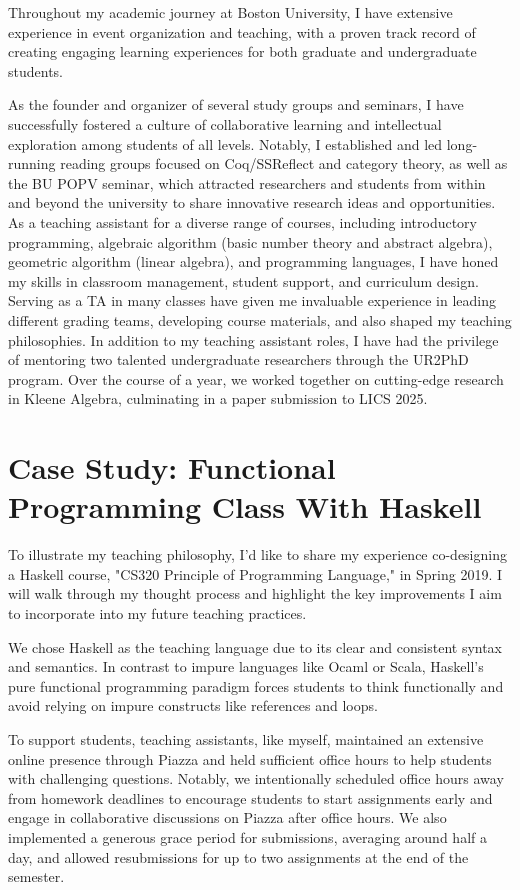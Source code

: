 \documentclass[11pt,a4paper,sans]{moderncv} %
\begin{document}
Throughout my academic journey at Boston University, I have extensive experience in event organization and teaching, with a proven track record of creating engaging learning experiences for both graduate and undergraduate students.

As the founder and organizer of several study groups and seminars, I have successfully fostered a culture of collaborative learning and intellectual exploration among students of all levels. 
Notably, I established and led long-running reading groups focused on Coq/SSReflect and category theory, as well as the BU POPV seminar, which attracted researchers and students from within and beyond the university to share innovative research ideas and opportunities.
As a teaching assistant for a diverse range of courses, including introductory programming, algebraic algorithm (basic number theory and abstract algebra), geometric algorithm (linear algebra), and programming languages, I have honed my skills in classroom management, student support, and curriculum design. 
Serving as a TA in many classes have given me invaluable experience in leading different grading teams, developing course materials, and also shaped my teaching philosophies.
In addition to my teaching assistant roles, I have had the privilege of mentoring two talented undergraduate researchers through the UR2PhD program. 
Over the course of a year, we worked together on cutting-edge research in Kleene Algebra, culminating in a paper submission to LICS 2025.

\section{Case Study: Functional Programming Class With Haskell}

To illustrate my teaching philosophy, I'd like to share my experience co-designing a Haskell course, "CS320 Principle of Programming Language," in Spring 2019.
I will walk through my thought process and highlight the key improvements I aim to incorporate into my future teaching practices.

We chose Haskell as the teaching language due to its clear and consistent syntax and semantics. 
In contrast to impure languages like Ocaml or Scala, Haskell's pure functional programming paradigm forces students to think functionally and avoid relying on impure constructs like references and loops.

To support students, teaching assistants, like myself, maintained an extensive online presence through Piazza and held sufficient office hours to help students with challenging questions. 
Notably, we intentionally scheduled office hours away from homework deadlines to encourage students to start assignments early and engage in collaborative discussions on Piazza after office hours.
We also implemented a generous grace period for submissions, averaging around half a day, and allowed resubmissions for up to two assignments at the end of the semester. 
\end{document}
